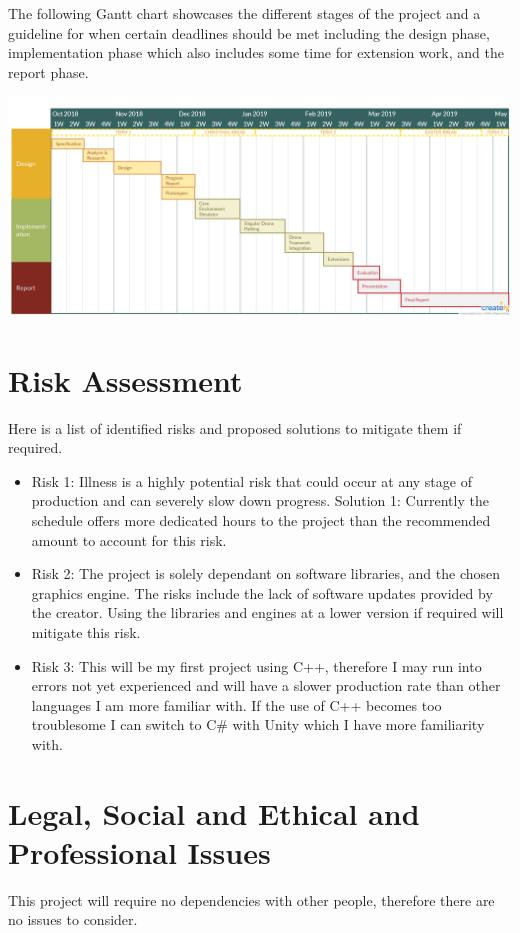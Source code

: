 \documentclass[12pt]{article}
\begin{document}
\pagebreak[4]

The following Gantt chart showcases the different stages of the project and a guideline for when certain deadlines should be met including the design phase, implementation phase which also includes some time for extension work, and the report phase.

\includegraphics[scale=0.22]{timetable.png}

\section{Risk Assessment}
Here is a list of identified risks and proposed solutions to mitigate them if required.

\begin{itemize}
    \item Risk 1: Illness is a highly potential risk that could occur at any stage of production and can severely slow down progress. Solution 1: Currently the schedule offers more dedicated hours to the project than the recommended amount to account for this risk.
    \item Risk 2: The project is solely dependant on software libraries, and the chosen graphics engine. The risks include the lack of software updates provided by the creator. Using the libraries and engines at a lower version if required will mitigate this risk.
    \item Risk 3: This will be my first project using C++, therefore I may run into errors not yet experienced and will have a slower production rate than other languages I am more familiar with. If the use of C++ becomes too troublesome I can switch to C\# with Unity which I have more familiarity with.
\end{itemize}

\section{Legal, Social and Ethical and Professional Issues}
This project will require no dependencies with other people, therefore there are no issues to consider.
\end{document}
